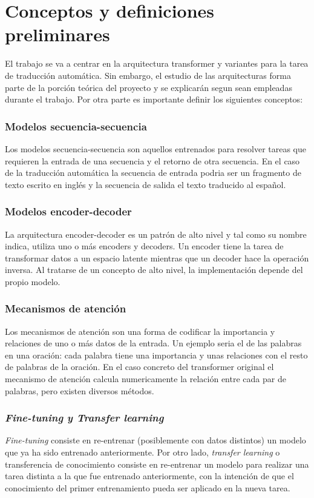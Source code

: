 \section{Conceptos y definiciones preliminares}
El trabajo se va a centrar en la arquitectura transformer \cite{Vaswani2017Jun} y variantes 
para la tarea de traducción automática. Sin embargo, el estudio de las arquitecturas
forma parte de la porción teórica del proyecto y se explicarán segun sean empleadas durante el trabajo.
Por otra parte es importante definir los siguientes conceptos:

\subsubsection{Modelos secuencia-secuencia}
Los modelos secuencia-secuencia son aquellos entrenados para
resolver tareas que requieren la entrada de una secuencia y el retorno de
otra secuencia.
En el caso de la traducción automática la secuencia de entrada podria ser
un fragmento de texto escrito en inglés y la secuencia de salida el texto
traducido al español.

\subsubsection{Modelos encoder-decoder}
La arquitectura encoder-decoder es un patrón de alto nivel y tal como su nombre indica,
utiliza uno o más encoders y decoders.
Un encoder tiene la tarea de transformar datos a un espacio latente
mientras que un decoder hace la operación inversa. Al tratarse de un concepto de alto nivel, la
implementación depende del propio modelo.

\subsubsection{Mecanismos de atención}
Los mecanismos de atención son una forma de codificar la importancia y relaciones de uno o más
datos de la entrada. Un ejemplo seria el de las palabras en una oración: cada palabra tiene una
importancia y unas relaciones con el resto de palabras de la oración.
En el caso concreto del transformer original \cite{Vaswani2017Jun} el mecanismo de atención
calcula numericamente la relación entre cada par de palabras, pero existen diversos métodos.

\subsubsection{\textit{Fine-tuning y Transfer learning}}
\textit{Fine-tuning} consiste en re-entrenar (posiblemente con datos distintos) un modelo que ya ha
sido entrenado anteriormente. Por otro lado, \textit{transfer learning} o transferencia de conocimiento
consiste en re-entrenar un modelo para realizar una tarea distinta a la que fue entrenado anteriormente,
con la intención de que el conocimiento del primer entrenamiento pueda ser aplicado en la nueva tarea.

